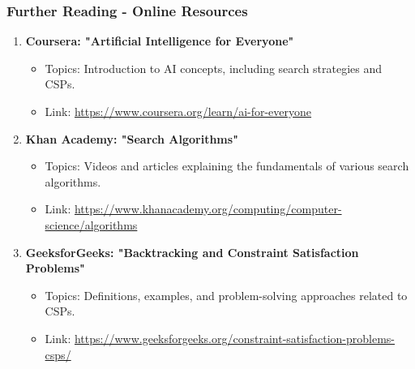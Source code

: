 \documentclass[aspectratio=169]{beamer}
\begin{document}
\begin{frame}[fragile]
    \frametitle{Further Reading - Online Resources}
    \begin{enumerate}
        \item \textbf{Coursera: "Artificial Intelligence for Everyone"}
        \begin{itemize}
            \item Topics: Introduction to AI concepts, including search strategies and CSPs.
            \item Link: \url{https://www.coursera.org/learn/ai-for-everyone}
        \end{itemize}
        
        \item \textbf{Khan Academy: "Search Algorithms"}
        \begin{itemize}
            \item Topics: Videos and articles explaining the fundamentals of various search algorithms.
            \item Link: \url{https://www.khanacademy.org/computing/computer-science/algorithms}
        \end{itemize}
        
        \item \textbf{GeeksforGeeks: "Backtracking and Constraint Satisfaction Problems"}
        \begin{itemize}
            \item Topics: Definitions, examples, and problem-solving approaches related to CSPs.
            \item Link: \url{https://www.geeksforgeeks.org/constraint-satisfaction-problems-csps/}
        \end{itemize}
    \end{enumerate}
\end{frame}
\end{document}
